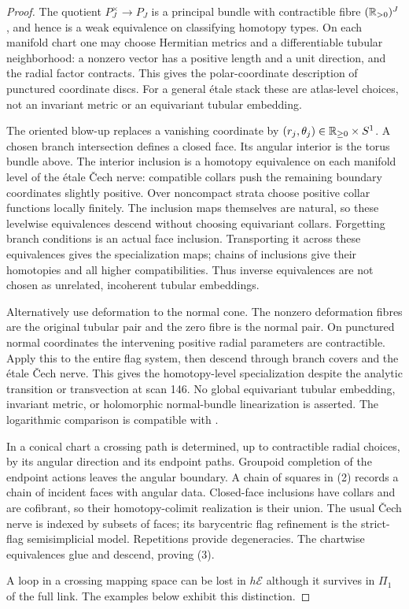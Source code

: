\begin{proof}
The quotient $P_J^\times\to P_J$ is a principal bundle with
contractible fibre $(\mathbb R_{>0})^J$, and hence is a weak equivalence
on classifying homotopy types. On each manifold chart one may
choose Hermitian metrics and a differentiable tubular neighborhood:
a nonzero vector has a positive length and a unit direction, and
the radial factor contracts. This gives the polar-coordinate
description of punctured coordinate discs. For a general étale
stack these are atlas-level choices, not an invariant metric or
an equivariant tubular embedding.

The oriented blow-up replaces a vanishing coordinate by
$(r_j,\theta_j)\in\mathbb R_{\ge0}\times S^1$. A chosen branch
intersection defines a closed face. Its angular interior is the
torus bundle above. The interior inclusion is a homotopy
equivalence on each manifold level of the étale Čech nerve:
compatible collars push the remaining boundary coordinates
slightly positive. Over noncompact strata choose positive collar
functions locally finitely. The inclusion maps themselves are
natural, so these levelwise equivalences descend without choosing
equivariant collars. Forgetting branch
conditions is an actual face inclusion. Transporting it across
these equivalences gives the specialization maps; chains of
inclusions give their homotopies and all higher compatibilities.
Thus inverse equivalences are not chosen as unrelated,
incoherent tubular embeddings.

Alternatively use deformation to the normal cone. The nonzero
deformation fibres are the original tubular pair and the zero
fibre is the normal pair. On punctured normal coordinates the
intervening positive radial parameters are contractible.
Apply this to the entire flag system, then descend through
branch covers and the étale Čech nerve. This gives the
homotopy-level specialization despite the analytic transition
or transvection at scan 146. No global equivariant tubular
embedding, invariant metric, or holomorphic normal-bundle
linearization is asserted. The logarithmic comparison
is compatible with \citet{KatoNakayama1999}.

In a conical chart a crossing path is determined, up to
contractible radial choices, by its angular direction and
its endpoint paths. Groupoid completion of the endpoint
actions leaves the angular boundary. A chain of squares in
(2) records a chain of incident faces with angular data.
Closed-face inclusions have collars and are cofibrant, so
their homotopy-colimit realization is their union.
The usual Čech nerve is indexed by subsets of faces;
its barycentric flag refinement is the strict-flag
semisimplicial model. Repetitions provide degeneracies.
The chartwise equivalences glue and descend, proving (3).

A loop in a crossing mapping space can be lost in
$h\mathcal E$ although it survives in $\Pi_1$ of the full
link. The examples below exhibit this distinction.
\end{proof}

